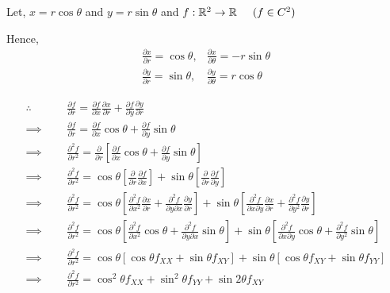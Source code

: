 \documentclass[Analysis-3]{subfiles}
\begin{document}
Let, $x = r\cos \theta$ and $y= r\sin \theta$ and $f : \mathbb{R}^2 \to \mathbb{R} \hspace{5mm} ( f \in C^2) $

Hence, 
\[\begin{matrix}
	\frac{\partial x}{\partial r} = \cos \theta , & \frac{\partial x}{\partial \theta} = -r\sin \theta \\
	\frac{\partial y}{\partial r} = \sin \theta , & \frac{\partial y}{\partial \theta} = r\cos \theta
\end{matrix}\]

 \begin{align*}
	\therefore \hspace{1cm}	& \frac{\partial f}{\partial r } = \frac{\partial f}{\partial x} \frac{\partial x}{\partial r} + \frac{\partial f}{\partial y} \frac{\partial y}{\partial r} \\
	 \implies& \frac{\partial f}{\partial r } = \frac{\partial f}{\partial x} \cos \theta + \frac{\partial f}{\partial y} \sin \theta \\
	\implies & \frac{\partial^2 f}{\partial r^2 } = \frac{\partial}{\partial r} \left[\frac{\partial f}{\partial x} \cos \theta + \frac{\partial f}{\partial y} \sin \theta \right] \\
	 \implies & \frac{\partial^2 f}{\partial r^2 } = \cos \theta \left[\frac{\partial}{\partial r} \frac{\partial f}{\partial x}\right] + \sin \theta \left[\frac{\partial}{\partial r} \frac{\partial f}{\partial y} \right] \\
	 \implies & \frac{\partial^2 f}{\partial r^2 } = \cos \theta \left[\frac{\partial^2 f}{\partial x^2} \frac{\partial x}{\partial r} + \frac{\partial^2 f}{\partial y \partial x} \frac{\partial y}{\partial r} \right] + \sin \theta \left[\frac{\partial^2 f}{\partial x \partial y} \frac{\partial x}{\partial r} + \frac{\partial^2 f}{\partial y^2} \frac{\partial y}{\partial r} \right] \\ 
	 \implies & \frac{\partial^2 f}{\partial r^2 } = \cos \theta \left[\frac{\partial^2 f}{\partial x^2} \cos \theta + \frac{\partial^2 f}{\partial y \partial x} \sin \theta \right] + \sin \theta \left[\frac{\partial^2 f}{\partial x \partial y} \cos \theta + \frac{\partial^2 f}{\partial y^2} \sin \theta \right] \\
	 \implies & \frac{\partial^2 f}{\partial r^2 } = \cos \theta \left[\cos \theta f_{XX} + \sin \theta f_{XY} \right] + \sin \theta \left[\cos \theta f_{XY} + \sin \theta f_{YY} \right] \\
	 \implies & \boxed{\frac{\partial^2 f}{\partial r^2 } = \cos^2 \theta f_{XX} + \sin^2 \theta f_{YY} + \sin 2 \theta f_{XY}}
\end{align*}
\end{document}
